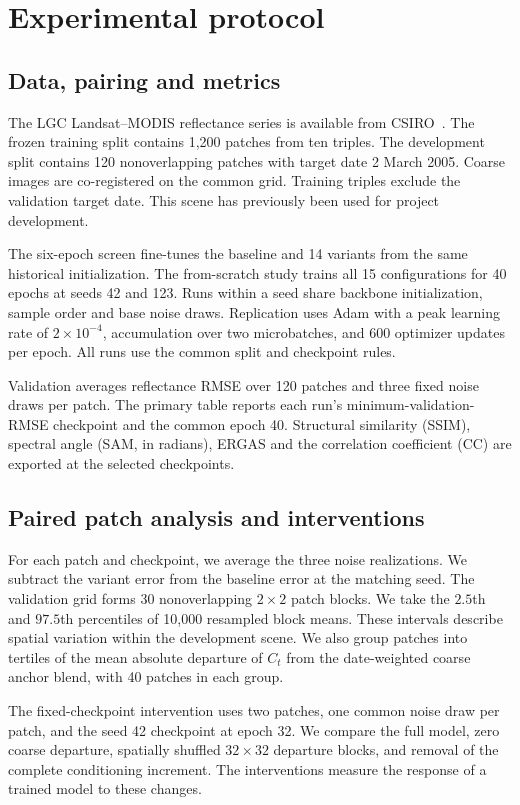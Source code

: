 \documentclass[a4paper,10pt,twocolumn]{article}
\begin{document}
\section{Experimental protocol}
\subsection{Data, pairing and metrics}
The LGC Landsat--MODIS reflectance series is available from CSIRO~\citep{emelyanova2013blending,csiro2014lgc}. The frozen training split contains 1,200 patches from ten triples. The development split contains 120 nonoverlapping patches with target date 2 March 2005. Coarse images are co-registered on the common grid. Training triples exclude the validation target date. This scene has previously been used for project development.

The six-epoch screen fine-tunes the baseline and 14 variants from the same historical initialization. The from-scratch study trains all 15 configurations for 40 epochs at seeds 42 and 123. Runs within a seed share backbone initialization, sample order and base noise draws. Replication uses Adam with a peak learning rate of $2\times10^{-4}$, accumulation over two microbatches, and 600 optimizer updates per epoch. All runs use the common split and checkpoint rules.

Validation averages reflectance RMSE over 120 patches and three fixed noise draws per patch. The primary table reports each run's minimum-validation-RMSE checkpoint and the common epoch 40. Structural similarity (SSIM), spectral angle (SAM, in radians), ERGAS and the correlation coefficient (CC) are exported at the selected checkpoints.

\subsection{Paired patch analysis and interventions}
For each patch and checkpoint, we average the three noise realizations. We subtract the variant error from the baseline error at the matching seed. The validation grid forms 30 nonoverlapping $2\times2$ patch blocks. We take the $2.5$th and $97.5$th percentiles of 10,000 resampled block means. These intervals describe spatial variation within the development scene. We also group patches into tertiles of the mean absolute departure of $C_t$ from the date-weighted coarse anchor blend, with 40 patches in each group.

The fixed-checkpoint intervention uses two patches, one common noise draw per patch, and the seed 42 checkpoint at epoch 32. We compare the full model, zero coarse departure, spatially shuffled $32\times32$ departure blocks, and removal of the complete conditioning increment. The interventions measure the response of a trained model to these changes.
\end{document}
